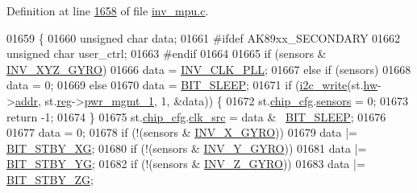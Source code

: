 Definition at line \hyperlink{inv__mpu_8c_source_l01658}{1658} of file \hyperlink{inv__mpu_8c_source}{inv\+\_\+mpu.\+c}.


\begin{DoxyCode}
01659 \{
01660     \textcolor{keywordtype}{unsigned} \textcolor{keywordtype}{char} data;
01661 \textcolor{preprocessor}{#ifdef AK89xx\_SECONDARY}
01662     \textcolor{keywordtype}{unsigned} \textcolor{keywordtype}{char} user\_ctrl;
01663 \textcolor{preprocessor}{#endif}
01664 
01665     \textcolor{keywordflow}{if} (sensors & \hyperlink{group___d_r_i_v_e_r_s_ga3fdc30f9c0a26c2c4e2bb88921f91629}{INV\_XYZ\_GYRO})
01666         data = \hyperlink{inv__mpu_8c_a75570f009627c6f4ddfb2d936d81e207a01b240917a78674d3e387110a6a8f94c}{INV\_CLK\_PLL};
01667     \textcolor{keywordflow}{else} \textcolor{keywordflow}{if} (sensors)
01668         data = 0;
01669     \textcolor{keywordflow}{else}
01670         data = \hyperlink{inv__mpu_8c_a1fed8bd436e9b7dfccb1cae99ca89103}{BIT\_SLEEP};
01671     \textcolor{keywordflow}{if} (\hyperlink{_i2_c_8c_ac0f145afe8d662af199043939f4398d6}{i2c\_write}(st.\hyperlink{structgyro__state__s_a5bac30a96752691e4cc723735060e360}{hw}->\hyperlink{structhw__s_a4c34a946600e9d68b6355d23f54d291b}{addr}, st.\hyperlink{structgyro__state__s_ae857e1285c583b7438a208edd691a38e}{reg}->\hyperlink{structgyro__reg__s_ad746a196c317f0f4d557a92b9eb98d34}{pwr\_mgmt\_1}, 1, &data)) \{
01672         st.\hyperlink{structgyro__state__s_ac895217592e2084bd520b0be8e9d20ee}{chip\_cfg}.\hyperlink{structchip__cfg__s_aaa21c01566947e7007476657cb614e3f}{sensors} = 0;
01673         \textcolor{keywordflow}{return} -1;
01674     \}
01675     st.\hyperlink{structgyro__state__s_ac895217592e2084bd520b0be8e9d20ee}{chip\_cfg}.\hyperlink{structchip__cfg__s_a2ac4d2f6d885669a21842e13dd3c5241}{clk\_src} = data & ~\hyperlink{inv__mpu_8c_a1fed8bd436e9b7dfccb1cae99ca89103}{BIT\_SLEEP};
01676 
01677     data = 0;
01678     \textcolor{keywordflow}{if} (!(sensors & \hyperlink{group___d_r_i_v_e_r_s_gabf02bf28541421d59f8be764f2b95407}{INV\_X\_GYRO}))
01679         data |= \hyperlink{inv__mpu_8c_a82256fedeffe5b2443ab3ae34cf032d9}{BIT\_STBY\_XG};
01680     \textcolor{keywordflow}{if} (!(sensors & \hyperlink{group___d_r_i_v_e_r_s_gacdd8ff833a34dba08ca2aa145eb92b44}{INV\_Y\_GYRO}))
01681         data |= \hyperlink{inv__mpu_8c_abf1c0a844906a5e887a659971a4af417}{BIT\_STBY\_YG};
01682     \textcolor{keywordflow}{if} (!(sensors & \hyperlink{group___d_r_i_v_e_r_s_ga50205b5cc6089b33b2561c854eb8b0fd}{INV\_Z\_GYRO}))
01683         data |= \hyperlink{inv__mpu_8c_a30967a4efdf3c3f1e39814e72a4168b0}{BIT\_STBY\_ZG};

\end{DoxyCode}

